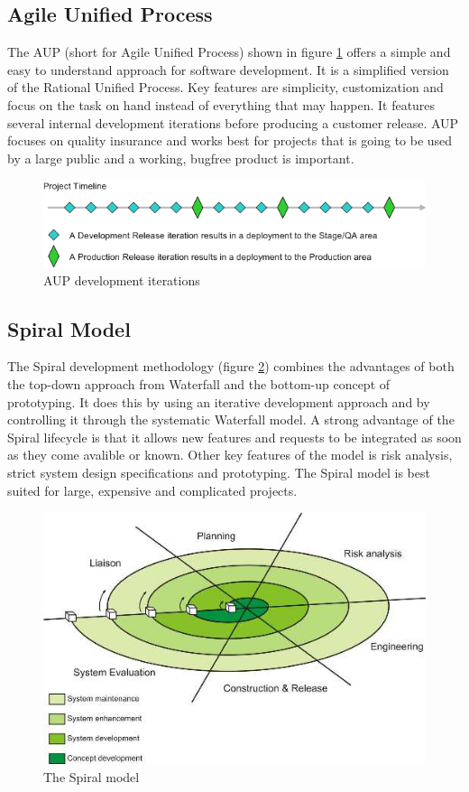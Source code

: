 \subsection{Agile Unified Process}
The AUP (short for Agile Unified Process) shown in figure \ref{fig:designmodel-aup} offers a simple and easy to understand approach for software
development. It is a simplified version of the Rational Unified Process. Key features are simplicity, 
customization and focus on the task on hand instead of everything that may happen. It features
several internal development iterations before producing a customer release. AUP focuses on quality
insurance and works best for projects that is going to be used by a large public and a working, bugfree
product is important.
\begin{figure}[h!]
\centering \includegraphics[scale=0.65]{img/designmodel-aup} \caption{AUP development iterations\cite{link:wiki}}
\label{fig:designmodel-aup}
\end{figure}

\subsection{Spiral Model}
The Spiral development methodology (figure \ref{fig:designmodel-spiral}) combines the advantages of both the top-down approach 
from Waterfall and the bottom-up concept of prototyping. It does this by using an iterative development
approach and by controlling it through the systematic Waterfall model. A strong advantage of the Spiral lifecycle is that it
allows new features and requests to be integrated as soon as they come avalible or known. Other key 
features of the model is risk analysis, strict system design specifications and prototyping. The Spiral model
 is best suited for large, expensive and complicated projects.
\begin{figure}[h!]
\centering \includegraphics[scale=0.85]{img/designmodel-spiral} \caption{The Spiral model~\cite{link:spiral}}
\label{fig:designmodel-spiral}
\end{figure}

